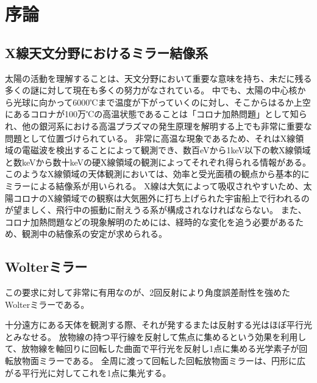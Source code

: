 \chapter{序論}
\thispagestyle{empty}
\label{chap1}
\graphicspath{{chap1/figure/}}
\minitoc


\newpage
\section{X線天文分野におけるミラー結像系}
\label{chap1_imaging_mirror_in_astronomy}
太陽の活動を理解することは、天文分野において重要な意味を持ち、未だに残る多くの謎に対して現在も多くの努力がなされている。
中でも、太陽の中心核から光球に向かって6000℃まで温度が下がっていくのに対し、そこからはるか上空にあるコロナが100万℃の高温状態であることは「コロナ加熱問題」として知られ、他の銀河系における高温プラズマの発生原理を解明する上でも非常に重要な問題として位置づけられている。\cite{ShimizuToshifumi2018}
非常に高温な現象であるため、それはX線領域の電磁波を検出することによって観測でき、数百eVから1keV以下の軟X線領域と数keVから数十keVの硬X線領域の観測によってそれぞれ得られる情報がある。
このようなX線領域の天体観測においては、効率と受光面積の観点から基本的にミラーによる結像系が用いられる。
X線は大気によって吸収されやすいため、太陽コロナのX線領域での観察は大気圏外に打ち上げられた宇宙船上で行われるのが望ましく、飛行中の振動に耐えうる系が構成されなければならない。
また、コロナ加熱問題などの現象解明のためには、経時的な変化を追う必要があるため、観測中の結像系の安定が求められる。

\clearpage
\newpage

\section{Wolterミラー}
\label{chap1_wolter_mirror}

この要求に対して非常に有用なのが、2回反射により角度誤差耐性を強めたWolterミラーである。\cite{1952AnP...445...94W}

十分遠方にある天体を観測する際、それが発するまたは反射する光はほぼ平行光とみなせる。
放物線の持つ平行線を反射して焦点に集めるという効果を利用して、放物線を軸回りに回転した曲面で平行光を反射し1点に集める光学素子が回転放物面ミラーである。
全周に渡って回転した回転放物面ミラーは、円形に広がる平行光に対してこれを1点に集光する。

